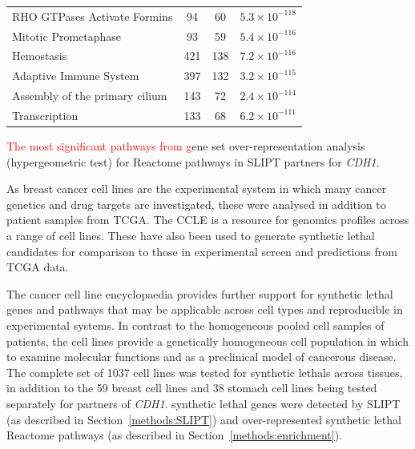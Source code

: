 \begin{table}[!b]
{\begin{threeparttable}
\begin{tabular}{lccc}
  \rowcolor{black!10}
  RHO GTPases Activate Formins &  94 &  60 & $5.3 \times 10^{-118}$ \\ 
  \rowcolor{black!5}
  Mitotic Prometaphase &  93 &  59 & $5.4 \times 10^{-116}$ \\ 
  \rowcolor{black!10}
  Hemostasis & 421 & 138 & $7.2 \times 10^{-116}$ \\ 
  \rowcolor{black!5}
  Adaptive Immune System & 397 & 132 & $3.2 \times 10^{-115}$ \\ 
  \rowcolor{black!10}
  Assembly of the primary cilium & 143 &  72 & $2.4 \times 10^{-114}$ \\ 
  \rowcolor{black!5}
  Transcription & 133 &  68 & $6.2 \times 10^{-111}$ \\ 
   \hline
\end{tabular}
\begin{tablenotes}
\raggedright %
\textcolor{red}{The most significant pathways from g}ene set over-representation analysis (hypergeometric test) for Reactome \glspl{pathway} in \gls{SLIPT} partners for \textit{CDH1}.
\end{tablenotes}
\end{threeparttable}
}
\end{table}

As breast cancer cell lines are the experimental system in which many cancer genetics and drug targets are investigated, these were analysed in addition to patient samples from \gls{TCGA}. The CCLE is a resource for \glspl{genomic} profiles across a range of cell lines. These have also been used to generate \gls{synthetic lethal} candidates for comparison to those in experimental screen and predictions from \gls{TCGA}  data.

The cancer cell line encyclopaedia provides further support for \gls{synthetic lethal} genes and \glspl{pathway} that may be applicable across cell types and reproducible in experimental systems. In contrast to the homogeneous pooled cell samples of patients,  the cell lines provide a genetically homogeneous cell population in which to examine molecular functions and as a preclinical model of cancerous disease. The complete set of 1037 cell lines was tested for \glspl{synthetic lethal} across tissues, in addition to the 59 breast cell lines and 38 stomach cell lines being tested separately for partners of \textit{CDH1}. \Gls{synthetic lethal} genes were detected by \gls{SLIPT} (as described in Section~\ref{methods:SLIPT}) and over-represented \gls{synthetic lethal} Reactome \glspl{pathway} (as described in Section~\ref{methods:enrichment}). 

